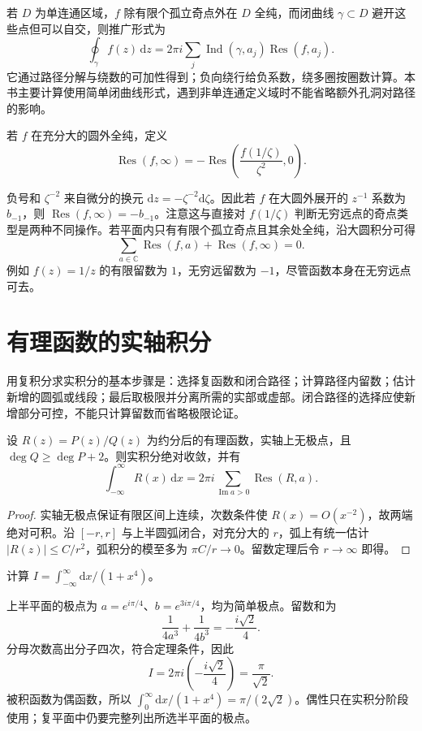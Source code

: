 \documentclass[UTF8,12pt,a4paper,fontset=fandol]{ctexbook}
\begin{document}
若 $D$ 为单连通区域，$f$ 除有限个孤立奇点外在 $D$ 全纯，而闭曲线 $\gamma\subset D$ 避开这些点但可以自交，则推广形式为
\[
 \oint_\gamma f(z)\,\mathrm dz
 =2\pi i\sum_j\operatorname{Ind}(\gamma,a_j)\operatorname{Res}(f,a_j).
\]
它通过路径分解与绕数的可加性得到；负向绕行给负系数，绕多圈按圈数计算。本书主要计算使用简单闭曲线形式，遇到非单连通定义域时不能省略额外孔洞对路径的影响。

\begin{definition}[无穷远点的留数]
若 $f$ 在充分大的圆外全纯，定义
\begin{equation}
 \operatorname{Res}(f,\infty)
 =-\operatorname{Res}\left(\frac{f(1/\zeta)}{\zeta^2},0\right).
 \label{eq:cv-residue-infinity}
\end{equation}
\end{definition}

负号和 $\zeta^{-2}$ 来自微分的换元 $\mathrm dz=-\zeta^{-2}\mathrm d\zeta$。因此若 $f$ 在大圆外展开的 $z^{-1}$ 系数为 $b_{-1}$，则 $\operatorname{Res}(f,\infty)=-b_{-1}$。注意这与直接对 $f(1/\zeta)$ 判断无穷远点的奇点类型是两种不同操作。若平面内只有有限个孤立奇点且其余处全纯，沿大圆积分可得
\[
 \sum_{a\in\mathbb C}\operatorname{Res}(f,a)+\operatorname{Res}(f,\infty)=0.
\]
例如 $f(z)=1/z$ 的有限留数为 $1$，无穷远留数为 $-1$，尽管函数本身在无穷远点可去。

\section{有理函数的实轴积分}

用复积分求实积分的基本步骤是：选择复函数和闭合路径；计算路径内留数；估计新增的圆弧或线段；最后取极限并分离所需的实部或虚部。闭合路径的选择应使新增部分可控，不能只计算留数而省略极限论证。

\begin{theorem}[有理函数的上半平面公式]
\label{thm:cv-rational-real}
设 $R(z)=P(z)/Q(z)$ 为约分后的有理函数，实轴上无极点，且 $\deg Q\ge\deg P+2$。则实积分绝对收敛，并有
\[
 \int_{-\infty}^{\infty}R(x)\,\mathrm dx
 =2\pi i\sum_{\operatorname{Im}a>0}\operatorname{Res}(R,a).
\]
\end{theorem}
\begin{proof}
实轴无极点保证有限区间上连续，次数条件使 $R(x)=O(x^{-2})$，故两端绝对可积。沿 $[-r,r]$ 与上半圆弧闭合，对充分大的 $r$，弧上有统一估计 $|R(z)|\le C/r^2$，弧积分的模至多为 $\pi C/r\to0$。留数定理后令 $r\to\infty$ 即得。
\end{proof}

\begin{example}[一个四次分母的积分]
\label{ex:cv-quartic-integral}
计算 $I=\int_{-\infty}^{\infty}\mathrm dx/(1+x^4)$。
\end{example}
\begin{solve}
上半平面的极点为 $a=e^{i\pi/4}$、$b=e^{3i\pi/4}$，均为简单极点。留数和为
\[
 \frac1{4a^3}+\frac1{4b^3}=-\frac{i\sqrt2}{4}.
\]
分母次数高出分子四次，符合定理条件，因此
\[
 I=2\pi i\left(-\frac{i\sqrt2}{4}\right)=\frac\pi{\sqrt2}.
\]
被积函数为偶函数，所以 $\int_0^\infty\mathrm dx/(1+x^4)=\pi/(2\sqrt2)$。偶性只在实积分阶段使用；复平面中仍要完整列出所选半平面的极点。
\end{solve}
\end{document}
